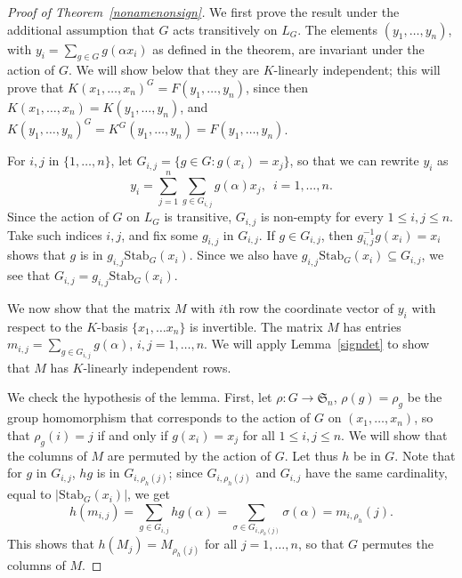 \documentclass[12pt]{article}
\theoremstyle{plain}
\begin{document}
\begin{proof}[Proof of Theorem~\ref{nonamenonsign}]
  We first prove the result under the additional assumption that $G$ acts
  transitively on $L_G$.  The elements $(y_1,\dots,y_n)$, with $y_i =
  \sum_{g \in G} g(\alpha x_i)$ as defined in the theorem, are invariant under
  the action of $G$. We will show below that they are $K$-linearly
  independent; this will prove that
  $K(x_1,\dots,x_n)^G=F(y_1,\dots,y_n)$, since then
  $K(x_1,\dots,x_n)=K(y_1,\dots,y_n)$, and
  $K(y_1,\dots,y_n)^G=K^G(y_1,\dots,y_n)=F(y_1,\dots,y_n)$.

  For $i,j$ in $\{1,\dots,n\}$, let $G_{i,j}= \lbrace g \in G: g(x_i)
  = x_j \rbrace$, so that we can rewrite $y_i$ as $$y_i = \sum^n_{j
    =1}\sum_{g \in G_{i,j}}g(\alpha)x_j, \,\,\, i = 1, \ldots, n.$$
  Since the action of $G$ on $L_G$ is transitive, $G_{i,j}$ is
  non-empty for every $1 \leq i,j \leq n$.  Take such indices $i,j$,
  and fix some $g_{i,j}$ in $G_{i,j}$. If $g \in G_{i,j}$, then
  $g^{-1}_{i,j}g(x_i) = x_i$ shows that $g$ is in
  $g_{i,j}\mathrm{Stab}_G(x_i)$. Since we also have
  $g_{i,j}\mathrm{Stab}_G(x_i) \subseteq G_{i,j}$, we see that
  $G_{i,j} = g_{i,j}\mathrm{Stab}_G(x_i)$.


  We now show that the matrix $M$ with $i$th row the coordinate vector
  of $y_i$ with respect to the $K$-basis $\lbrace x_1, \ldots x_n
  \rbrace$ is invertible. The matrix $M$ has entries $m_{i,j} =
  \sum_{g \in G_{i,j}}g(\alpha)$, $i,j = 1, \ldots, n$. We will apply
  Lemma~\ref{signdet} to show that $M$ has $K$-linearly independent
  rows.

  We check the hypothesis of the lemma. First, let $\rho: G \to
  \mathfrak{S}_n$, $\rho(g) = \rho_g$ be the group homomorphism that
  corresponds to the action of $G$ on $(x_1, \ldots , x_n)$, so that
  $\rho_g(i) = j$ if and only if $g(x_i) = x_j$ for all $1 \leq
  i,j\leq n$. We will show that the columns of $M$ are permuted by the
  action of $G$. Let thus $h$ be in $G$. Note that for $g$ in
  $G_{i,j}$, $hg$ is in $G_{i,\rho_h(j)}$; since $G_{i,\rho_h(j)}$ and
  $G_{i,j}$ have the same cardinality, equal to
  $|\mathrm{Stab}_G(x_i)|$, we get
  $$h(m_{i,j}) = \sum_{g \in G_{i,j}}hg(\alpha) = \sum_{\sigma \in
    G_{i, \rho_{h}(j)}}\sigma (\alpha) = m_{i,\rho_{h}}(j).$$ This
  shows that $h(M_j) = M_{\rho_h(j)}$ for all $j = 1, \ldots, n$, so
  that $G$ permutes the columns of $M$. 
  

\end{proof}
\end{document}
